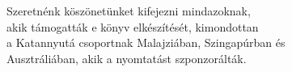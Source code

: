 
\vspace*{4\baselineskip}

{\centering

\begin{minipage}{0.9\linewidth}
\centering\small

Szeretnénk köszönetünket kifejezni mindazoknak,\\
akik támogatták e könyv elkészítését, kimondottan\\
a Katannyutá csoportnak Malajziában, Szingapúrban és\\
Ausztráliában, akik a nyomtatást szponzorálták.

\end{minipage}

}
